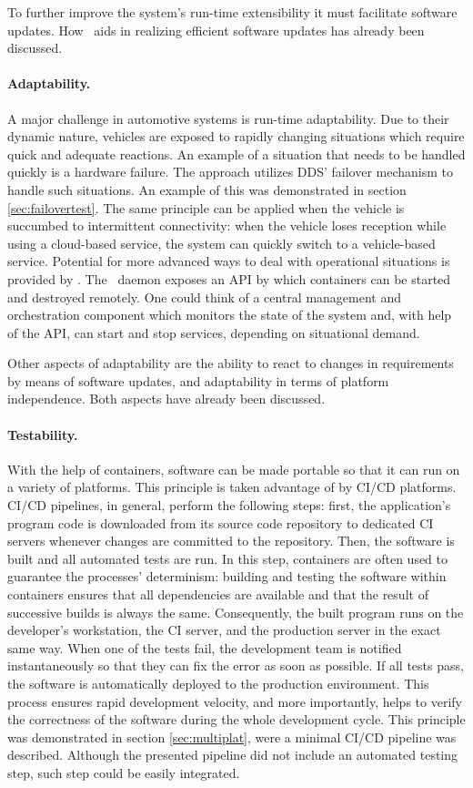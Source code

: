 To further improve the system's run-time extensibility it must facilitate software updates. How \docker\ aids in realizing efficient software updates has already been discussed.


\paragraph{Adaptability.}
A major challenge in automotive systems is run-time adaptability. Due to their dynamic nature, vehicles are exposed to rapidly changing situations which require quick and adequate reactions. An example of a situation that needs to be handled quickly is a hardware failure. The approach utilizes DDS' failover mechanism to handle such situations. An example of this was demonstrated in section \ref{sec:failovertest}. The same principle can be applied when the vehicle is succumbed to intermittent connectivity: when the vehicle loses reception while using a cloud-based service, the system can quickly switch to a vehicle-based service. Potential for more advanced ways to deal with operational situations is provided by \docker . The \docker\ daemon exposes an API by which containers can be started and destroyed remotely. One could think of a central management and orchestration component which monitors the state of the system and, with help of the API, can start and stop services, depending on situational demand. 

Other aspects of adaptability are the ability to react to changes in requirements by means of software updates, and adaptability in terms of platform independence. Both aspects have already been discussed.


\paragraph{Testability.}
With the help of containers, software can be made portable so that it can run on a variety of platforms. This principle is taken advantage of by CI/CD platforms. CI/CD pipelines, in general, perform the following steps: first, the application's program code is downloaded from its source code repository to dedicated CI servers whenever changes are committed to the repository. Then, the software is built and all automated tests are run. In this step, containers are often used  \cite{barna2017delivering} to guarantee the processes' determinism: building and testing the software within containers ensures that all dependencies are available and that the result of successive builds is always the same. Consequently, the built program runs on the developer's workstation, the CI server, and the production server in the exact same way.
When one of the tests fail, the development team is notified instantaneously so that they can fix the error as soon as possible. If all tests pass, the software is automatically deployed to the production environment. This process ensures rapid development velocity, and more importantly, helps to verify the correctness of the software during the whole development cycle. This principle was demonstrated in section \ref{sec:multiplat}, were a minimal CI/CD pipeline was described. Although the presented pipeline did not include an automated testing step, such step could be easily integrated. 

